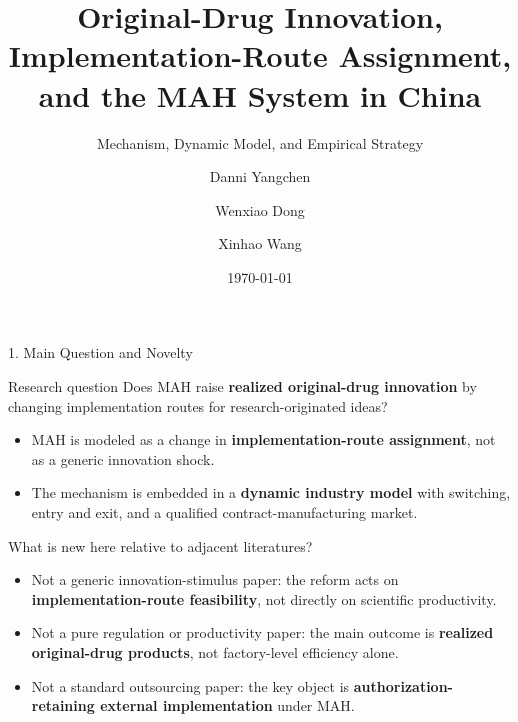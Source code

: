 \documentclass[aspectratio=169,11pt]{beamer}
\title[Original-Drug Innovation and MAH]{Original-Drug Innovation, Implementation-Route Assignment,\\ and the MAH System in China}
\subtitle{Mechanism, Dynamic Model, and Empirical Strategy}
\author{Danni Yangchen \and Wenxiao Dong \and Xinhao Wang}
\date{\today}
\begin{document}
\begin{frame}
\titlepage
\end{frame}

\begin{frame}{1. Main Question and Novelty}
\footnotesize
\begin{block}{Research question}
Does MAH raise \textbf{realized original-drug innovation} by changing implementation routes for research-originated ideas?
\end{block}

\begin{itemize}
\item MAH is modeled as a change in \textbf{implementation-route assignment}, not as a generic innovation shock.
\item The mechanism is embedded in a \textbf{dynamic industry model} with switching, entry and exit, and a qualified contract-manufacturing market.
\end{itemize}

\begin{block}{What is new here relative to adjacent literatures?}
\begin{itemize}
\item Not a generic innovation-stimulus paper: the reform acts on \textbf{implementation-route feasibility}, not directly on scientific productivity.
\item Not a pure regulation or productivity paper: the main outcome is \textbf{realized original-drug products}, not factory-level efficiency alone.
\item Not a standard outsourcing paper: the key object is \textbf{authorization-retaining external implementation} under MAH.
\end{itemize}
\end{block}
\end{frame}
\end{document}
